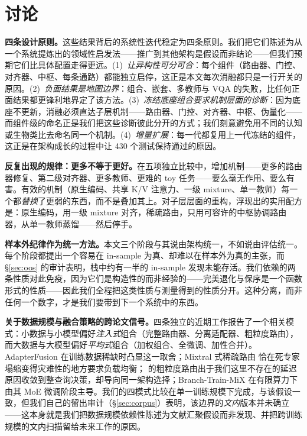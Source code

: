 \documentclass[10pt,twoside]{article}
\theoremstyle{definition}
\theoremstyle{plain}
\theoremstyle{remark}
\begin{document}
\section{讨论}
\label{sec:discussion}

\textbf{四条设计原则。}这些结果背后的系统性迭代稳定为四条原则。我们把它们陈述为从一个系统提炼出的领域性启发法——推广到其他架构是假设而非结论——但我们预期它们比具体配置走得更远。(1)~\emph{让异构性可分可合}：每个组件（路由器、门控、对齐器、中枢、每条通路）都能独立启停，这正是本文每次消融都只是一行开关的原因。(2)~\emph{负面结果是地图边界}：组合、嵌套、多教师与 VQA 的失败，比任何正面结果都更锋利地界定了该方法。(3)~\emph{冻结底座组合要求机制层面的诊断}：因为底座不更新，消融必须直达子层机制——路由器、门控、对齐器、中枢、伪量化——而组件级的命名正是我们把这些诊断彼此分开的方式；我们刻意避免用不同的认知或生物类比去命名同一个机制。(4)~\emph{增量扩展}：每一代都复用上一代冻结的组件，这正是在架构成长的过程中让 430 个测试保持通过的原因。

\textbf{反复出现的规律：更多不等于更好。}在五项独立比较中，增加机制——更多的路由器修复、第二级对齐器、更多教师、更难的 toy 任务——要么毫无作用、要么有害。有效的机制（原生编码、共享 K/V 注意力、一级 mixture、单一教师）每一个都\emph{替换}了更弱的东西，而不是叠加其上。对子层层面的重构，浮现出的实用配方是：原生编码，用一级 mixture 对齐，稀疏路由，只用可容许的中枢协调路由器，从单一教师蒸馏——然后停手。

\textbf{样本外纪律作为统一方法。}本文三个阶段与其说由架构统一，不如说由评估统一。每个阶段都提出一个容易在 in-sample 为真、却难以在样本外为真的主张，而 \S\ref{sec:oos} 的审计表明，栈中约有一半的 in-sample 发现未能存活。我们依赖的两条性质对此免疫，因为它们是构造性的而非经验的——完美退化与保序是一个函数形式的性质——因此我们全程把这类性质与测量得到的性质分开。这种分离，而非任何一个数字，才是我们要带到下一个系统中的东西。

\textbf{关于数据规模与融合策略的跨论文信号。}四条独立的近期工作报告了一个相关模式：小数据与小模型偏好\emph{注入式}组合（完整路由器、分离适配器、粗粒度路由），而大数据与大模型偏好\emph{平均式}组合（加权组合、全微调、加性合并）。AdapterFusion \citep{pfeiffer2021} 在训练数据稀缺时凸显这一取舍；Mixtral 式稀疏路由 \citep{jiang2024mixtral} 恰在死专家塌缩变得灾难性的地方要求负载均衡；\citet{liu2026orchestrating} 的粗粒度路由出于我们这里不存在的延迟原因收敛到整查询决策，却导向同一架构选择；Branch-Train-MiX \citep{sukhbaatar2024btx} 在有限算力下由其 MoE 微调阶段主导。我们的四模式比较在单一训练规模下完成，与该假设一致，但我们自己的留出审计（\S\ref{sec:corpus}）表明，该边界的\emph{文内}版本并未确立——这本身就是我们把数据规模依赖性陈述为文献汇聚假设而非发现、并把跨训练规模的文内扫描留给未来工作的原因。
\end{document}
